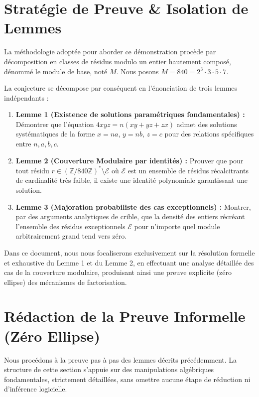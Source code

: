 \documentclass[11pt,a4paper]{article}
\theoremstyle{definition}
\theoremstyle{remark}
\begin{document}
\section{Strat\'egie de Preuve \& Isolation de Lemmes}

La m\'ethodologie adopt\'ee pour aborder ce d\'emonstration proc\`ede par d\'ecomposition en classes de r\'esidus modulo un entier hautement compos\'e, d\'enomm\'e le module de base, not\'e $M$. Nous posons $M = 840 = 2^3 \cdot 3 \cdot 5 \cdot 7$.

La conjecture se d\'ecompose par cons\'equent en l'\'enonciation de trois lemmes ind\'ependants :

\begin{enumerate}
\item \textbf{Lemme 1 (Existence de solutions param\'etriques fondamentales) :} D\'emontrer que l'\'equation $4xyz = n(xy + yz + zx)$ admet des solutions syst\'ematiques de la forme $x = na$, $y = nb$, $z = c$ pour des relations sp\'ecifiques entre $n, a, b, c$.
\item \textbf{Lemme 2 (Couverture Modulaire par identit\'es) :} Prouver que pour tout r\'esidu $r \in (\mathbb{Z}/840\mathbb{Z})^* \setminus \mathcal{E}$ o\`u $\mathcal{E}$ est un ensemble de r\'esidus r\'ecalcitrants de cardinalit\'e tr\`es faible, il existe une identit\'e polynomiale garantissant une solution.
\item \textbf{Lemme 3 (Majoration probabiliste des cas exceptionnels) :} Montrer, par des arguments analytiques de crible, que la densit\'e des entiers r\'ecr\'eant l'ensemble des r\'esidus exceptionnels $\mathcal{E}$ pour n'importe quel module arbitrairement grand tend vers z\'ero.
\end{enumerate}

Dans ce document, nous nous focaliserons exclusivement sur la r\'esolution formelle et exhaustive du Lemme 1 et du Lemme 2, en effectuant une analyse d\'etaill\'ee des cas de la couverture modulaire, produisant ainsi une preuve explicite (z\'ero ellipse) des m\'ecanismes de factorisation.
\section{R\'edaction de la Preuve Informelle (Z\'ero Ellipse)}

Nous proc\'edons \`a la preuve pas \`a pas des lemmes d\'ecrits pr\'ec\'edemment. La structure de cette section s'appuie sur des manipulations alg\'ebriques fondamentales, strictement d\'etaill\'ees, sans omettre aucune \'etape de r\'eduction ni d'inf\'erence logicielle.
\end{document}
